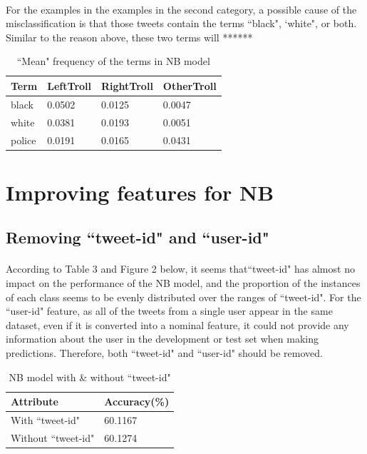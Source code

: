 \documentclass[11pt]{article}
\begin{document}
\paragraph{} For the examples in the examples in the second category, a possible cause of the misclassification is that those tweets contain the terms ``black", `white", or both. Similar to the reason above, these two terms will ******

\begin{table}[!htbp]
 \begin{center}
\begin{tabular}{| l | l | l | l |}
      \hline
      Term & LeftTroll & RightTroll & OtherTroll \\
      \hline\hline
      black & 0.0502 & 0.0125 & 0.0047 \\
      white & 0.0381 & 0.0193 & 0.0051 \\
      police & 0.0191 & 0.0165 & 0.0431 \\
      \hline
\end{tabular}
\caption{``Mean" frequency of the terms in NB model}\label{table2}
 \end{center}
\end{table}


\section{Improving features for NB}
\subsection{Removing ``tweet-id" and ``user-id"}

\paragraph{} According to Table 3 and Figure 2 below, it seems that``tweet-id" has almost no impact on the performance of the NB model, and the proportion of the instances of each class seems to be evenly distributed over the ranges of ``tweet-id". For the ``user-id" feature, as all of the tweets from a single user appear in the same dataset, even if it is converted into a nominal feature, it could not provide any information about the user in the development or test set when making predictions. Therefore, both ``tweet-id" and ``user-id" should be removed.

\begin{table}[!htbp]
 \begin{center}
\begin{tabular}{| l | l |}
      \hline
      Attribute & Accuracy(\%) \\
      \hline\hline
      With ``tweet-id" & 60.1167 \\
      Without ``tweet-id" & 60.1274 \\
      \hline
\end{tabular}
\caption{NB model with \& without ``tweet-id"}\label{table2}
 \end{center}
\end{table}
\end{document}
